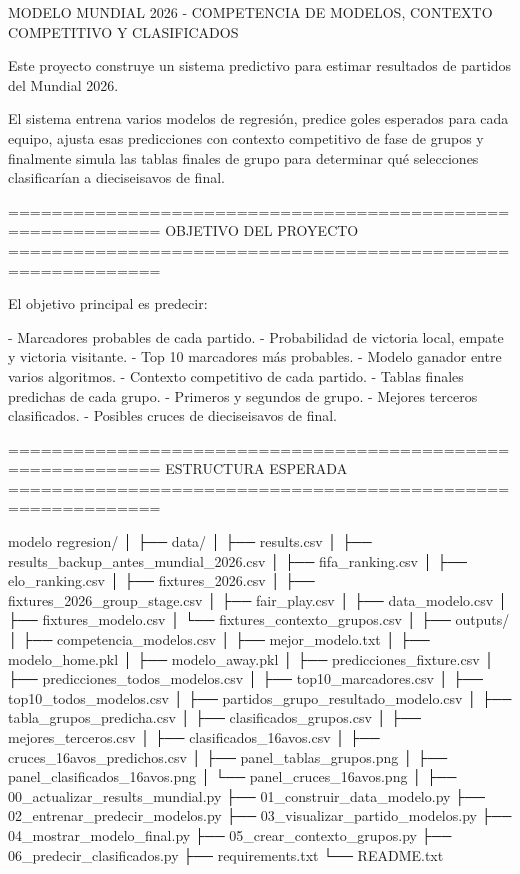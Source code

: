 MODELO MUNDIAL 2026 - COMPETENCIA DE MODELOS, CONTEXTO COMPETITIVO Y CLASIFICADOS

Este proyecto construye un sistema predictivo para estimar resultados de partidos del Mundial 2026.

El sistema entrena varios modelos de regresión, predice goles esperados para cada equipo, ajusta esas predicciones con contexto competitivo de fase de grupos y finalmente simula las tablas finales de grupo para determinar qué selecciones clasificarían a dieciseisavos de final.

============================================================
OBJETIVO DEL PROYECTO
============================================================

El objetivo principal es predecir:

- Marcadores probables de cada partido.
- Probabilidad de victoria local, empate y victoria visitante.
- Top 10 marcadores más probables.
- Modelo ganador entre varios algoritmos.
- Contexto competitivo de cada partido.
- Tablas finales predichas de cada grupo.
- Primeros y segundos de grupo.
- Mejores terceros clasificados.
- Posibles cruces de dieciseisavos de final.

============================================================
ESTRUCTURA ESPERADA
============================================================

modelo regresion/
│
├── data/
│   ├── results.csv
│   ├── results_backup_antes_mundial_2026.csv
│   ├── fifa_ranking.csv
│   ├── elo_ranking.csv
│   ├── fixtures_2026.csv
│   ├── fixtures_2026_group_stage.csv
│   ├── fair_play.csv
│   ├── data_modelo.csv
│   ├── fixtures_modelo.csv
│   └── fixtures_contexto_grupos.csv
│
├── outputs/
│   ├── competencia_modelos.csv
│   ├── mejor_modelo.txt
│   ├── modelo_home.pkl
│   ├── modelo_away.pkl
│   ├── predicciones_fixture.csv
│   ├── predicciones_todos_modelos.csv
│   ├── top10_marcadores.csv
│   ├── top10_todos_modelos.csv
│   ├── partidos_grupo_resultado_modelo.csv
│   ├── tabla_grupos_predicha.csv
│   ├── clasificados_grupos.csv
│   ├── mejores_terceros.csv
│   ├── clasificados_16avos.csv
│   ├── cruces_16avos_predichos.csv
│   ├── panel_tablas_grupos.png
│   ├── panel_clasificados_16avos.png
│   └── panel_cruces_16avos.png
│
├── 00_actualizar_results_mundial.py
├── 01_construir_data_modelo.py
├── 02_entrenar_predecir_modelos.py
├── 03_visualizar_partido_modelos.py
├── 04_mostrar_modelo_final.py
├── 05_crear_contexto_grupos.py
├── 06_predecir_clasificados.py
├── requirements.txt
└── README.txt

